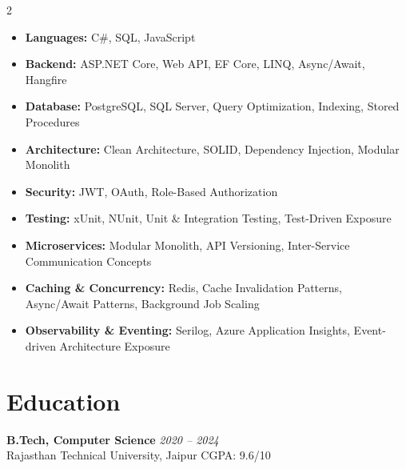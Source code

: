 \documentclass[a4paper,10pt]{article}
\newcommand{\resumeItem}[1]{\item #1}
\begin{document}
\begin{multicols}{2}
\begin{itemize}
    \resumeItem{\textbf{Languages:} C\#, SQL, JavaScript}
    \resumeItem{\textbf{Backend:} ASP.NET Core, Web API, EF Core, LINQ, Async/Await, Hangfire}
    \resumeItem{\textbf{Database:} PostgreSQL, SQL Server, Query Optimization, Indexing, Stored Procedures}
    \resumeItem{\textbf{Architecture:} Clean Architecture, SOLID, Dependency Injection, Modular Monolith}
    \resumeItem{\textbf{Security:} JWT, OAuth, Role-Based Authorization}
    \resumeItem{\textbf{Testing:} xUnit, NUnit, Unit \& Integration Testing, Test-Driven Exposure}
    \resumeItem{\textbf{Microservices:} Modular Monolith, API Versioning, Inter-Service Communication Concepts}
    \resumeItem{\textbf{Caching \& Concurrency:} Redis, Cache Invalidation Patterns, Async/Await Patterns, Background Job Scaling}
    \resumeItem{\textbf{Observability \& Eventing:} Serilog, Azure Application Insights, Event-driven Architecture Exposure}
\end{itemize}
\end{multicols}

\vspace{2mm}

\section*{Education}
\textbf{B.Tech, Computer Science} \hfill \textit{2020 -- 2024} \\
Rajasthan Technical University, Jaipur \hfill CGPA: 9.6/10
\end{document}
